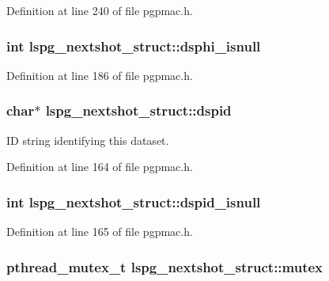 Definition at line 240 of file pgpmac.h.\hypertarget{structlspg__nextshot__struct_a2d1f51cb1bb575a214344773136be878}{
\subsubsection[{dsphi\_\-isnull}]{\setlength{\rightskip}{0pt plus 5cm}int {\bf lspg\_\-nextshot\_\-struct::dsphi\_\-isnull}}}
\label{structlspg__nextshot__struct_a2d1f51cb1bb575a214344773136be878}


Definition at line 186 of file pgpmac.h.\hypertarget{structlspg__nextshot__struct_a4487e718c2b55a8ab9ebb18329574ae1}{
\subsubsection[{dspid}]{\setlength{\rightskip}{0pt plus 5cm}char$\ast$ {\bf lspg\_\-nextshot\_\-struct::dspid}}}
\label{structlspg__nextshot__struct_a4487e718c2b55a8ab9ebb18329574ae1}


ID string identifying this dataset. 

Definition at line 164 of file pgpmac.h.\hypertarget{structlspg__nextshot__struct_a7665485395487756ab448d0c81c84d10}{
\subsubsection[{dspid\_\-isnull}]{\setlength{\rightskip}{0pt plus 5cm}int {\bf lspg\_\-nextshot\_\-struct::dspid\_\-isnull}}}
\label{structlspg__nextshot__struct_a7665485395487756ab448d0c81c84d10}


Definition at line 165 of file pgpmac.h.\hypertarget{structlspg__nextshot__struct_a38b657155fbee9b73278f76912cf2333}{
\subsubsection[{mutex}]{\setlength{\rightskip}{0pt plus 5cm}pthread\_\-mutex\_\-t {\bf lspg\_\-nextshot\_\-struct::mutex}}}
\label{structlspg__nextshot__struct_a38b657155fbee9b73278f76912cf2333}


